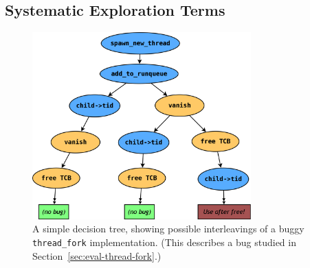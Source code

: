 \begin{enumerate}
\section{Systematic Exploration Terms}

\begin{figure}[h]
	\centering
	\includegraphics[width=0.75\textwidth]{threadfork.png}
	\caption{A simple decision tree, showing possible interleavings of a buggy \texttt{thread\_fork} implementation. (This describes a bug studied in Section~\ref{sec:eval-thread-fork}.)}
	\label{fig:threadfork}
\end{figure}



\end{enumerate}
